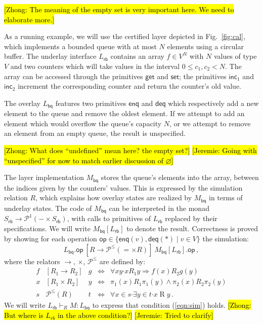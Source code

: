 \documentclass[sigplan,screen]{acmart}
\newcommand{\kw}[1]{\ensuremath{ \mathsf{#1} }}
\newcommand{\bdot}{\boldsymbol{\cdot}}
\newcommand{\hlc}[2][yellow]{ {\sethlcolor{#1} \hl{#2}} }
\newcommand\zhong[1]{\hlc[yellow]{[Zhong: #1]}}
\newcommand\jk[1]{\hlc[pink]{[Jeremie: #1]}}
\begin{document}
\zhong{The meaning of the empty set is very important here. We need to elaborate more.}

As a running example,
we will use the certified layer
depicted in Fig.~\ref{fig:cal},
which implements a bounded queue with at most $N$ elements
using a circular buffer.
The underlay interface $L_\kw{rb}$
contains an array $f \in V^N$
with $N$ values of type $V$ and two counters
which will take values in the interval $0 \le c_1, c_2 < N$.
The array can be accessed through the primitives
$\kw{get}$ and $\kw{set}$;
the primitives $\kw{inc}_1$ and $\kw{inc}_2$
increment the corresponding counter
and return the counter's old value.

The overlay $L_\kw{bq}$ features two primitives
$\kw{enq}$ and $\kw{deq}$
which respectively add a new element to the queue
and remove the oldest element.
If we attempt to add an element
which would overflow the queue's capacity $N$,
or we attempt to remove an element from an empty queue,
the result is unspecified.

\zhong{What does ``undefined'' mean here? the empty set?}
\jk{Going with ``unspecified'' for now to match earlier discussion
  of $\varnothing$}

The layer implementation $M_\kw{bq}$ 
stores the queue's elements into the array,
between the indices given by the counters' values.
This is expressed by the simulation relation $R$,
which explains how overlay states are realized by $M_\kw{bq}$ 
in terms of underlay states.
%
The code of $M_\kw{bq}$ can be interpreted in the monad
$
    S_\kw{rb} \rightarrow \mathcal{P}^1(- \times S_\kw{rb})
$,
with calls to primitives of $L_\kw{rb}$
replaced by their specifications.
We will write $M_\kw{bq}[L_\kw{rb}]$ to denote the result.
Correctness is proved by showing
for each operation
$\kw{op} \in \{ \kw{enq}(v), \kw{deq}(*) \mid v \in V \}$
the simulation:
\begin{equation}
  \label{eqn:sim}
  L_\kw{bq}.\kw{op}
  \: \mathrel{[R \rightarrow \mathcal{P}^\le({=} \times R)]} \:
  M_\kw{bq}[L_\kw{rb}].\kw{op} \,,
\end{equation}
where the relators $\rightarrow$, $\times$, $\mathcal{P}^\le$
are defined by:
\[
  \begin{array}{rclcl}
    f & [R_1 \rightarrow R_2] & g & \Leftrightarrow &
    \forall x y \bdot x \mathrel{R_1} y \Rightarrow
    f(x) \mathrel{R_2} g(y) \\
  x & [R_1 \times R_2] & y & \Leftrightarrow &
    \pi_1(x) \mathrel{R_1} \pi_1(y) \wedge
    \pi_2(x) \mathrel{R_2} \pi_2(y) \\
  s & \mathcal{P}^\le(R) & t & \Leftrightarrow &
    \forall x \in s \bdot \exists y \in t \bdot x \mathrel{R} y \,.
  \end{array}
\]
We will write $L_\kw{rb} \vdash_R M : L_\kw{bq}$
to express that condition (\ref{eqn:sim}) holds.
\zhong{But where is $L_{rb}$ in the above condition?}
\jk{Tried to clarify}
\end{document}

